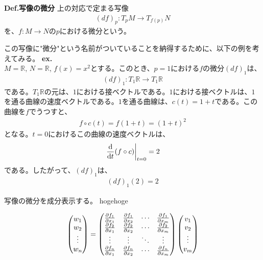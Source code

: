\documentclass[a4paper,11pt]{jsarticle}
\numberwithin{equation}{section}
\begin{document}
\begin{itembox}[l]{\textbf{Def.写像の微分}}
  上の対応で定まる写像
  \begin{align}
    (df)_p: T_pM \to T_{f(p)}N
  \end{align}
  を、$f: M \to N$の$p$における微分という。
\end{itembox}
この写像に"微分"という名前がついていることを納得するために、以下の例を考えてみる。
\textbf{ex.}\\
$M = \mathbb{R}$, $N = \mathbb{R}$, $f(x) = x^2$とする。このとき、$p = 1$における$f$の微分$(df)_1$は、
\begin{align}
  (df)_1: T_1\mathbb{R} \to T_1\mathbb{R}
\end{align}
である。$T_1\mathbb{R}$の元は、$1$における接ベクトルである。$1$における接ベクトルは、$1$を通る曲線の速度ベクトルである。$1$を通る曲線は、$c(t) = 1 + t$である。この曲線を$f$でうつすと、
\begin{align}
  f \circ c(t) = f(1 + t) = (1 + t)^2
\end{align}
となる。$t=0$におけるこの曲線の速度ベクトルは、
\begin{align}
  \left.\dv{t} (f \circ c)\right|_{t=0} = 2
\end{align}
である。したがって、$(df)_1$は、
\begin{align}
  (df)_1(2) = 2
\end{align}

写像の微分を成分表示する。
hogehoge

\begin{align}
  \begin{pmatrix}
    w_1 \\
    w_2 \\
    \vdots \\
    w_n
  \end{pmatrix}
  =
  \begin{pmatrix}
    \pdv{f_1}{x_1}(p) & \pdv{f_1}{x_2}(p) & \cdots & \pdv{f_1}{x_m}(p) \\
    \pdv{f_2}{x_1}(p) & \pdv{f_2}{x_2}(p) & \cdots & \pdv{f_2}{x_m}(p) \\
    \vdots & \vdots & \ddots & \vdots \\
    \pdv{f_n}{x_1}(p) & \pdv{f_n}{x_2}(p) & \cdots & \pdv{f_n}{x_m}(p)
  \end{pmatrix}
  \begin{pmatrix}
    v_1 \\
    v_2 \\
    \vdots \\
    v_m
  \end{pmatrix}
\end{align}
\end{document}
